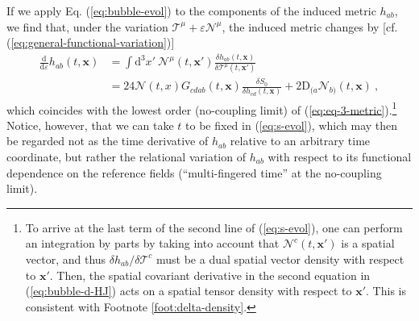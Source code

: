 \documentclass[12pt]{iopart}
\def\eq#1{\begin{equation}\begin{aligned}#1\end{aligned}\end{equation}}
\def\eref#1{(\ref{eq:#1})}
\def\D{\mathrm{d}}
\def\Del#1#2{\frac{\D#1}{\D#2}}
\def\N{\mathcal{N}}
\def\x{\mathbf{x}}
\def\T{\mathcal{T}}
\begin{document}
If we apply Eq. \eref{bubble-evol} to the components of the induced metric $h_{ab}$, we find that, under the variation $\T^{\mu}+\varepsilon\mathcal{N}^{\mu}$, the induced metric changes by [cf. \eref{general-functional-variation}]
\eq{\label{eq:s-evol}
\Del{}{\varepsilon}h_{ab}(t,\x) &= \int\D^3x'\ \N^{\mu}(t,\x')\frac{\delta h_{ab}(t,\x)}{\delta\T^{\mu}(t,\x')}\\
&=24\N(t,x)G_{cdab}(t,\x)\frac{\delta S_0}{\delta h_{cd}(t,\x)} +2\mathrm{D}_{(a}\N_{b)}(t,\x) \ ,
}
which coincides with the lowest order (no-coupling limit) of \eref{eq-3-metric}.\footnote{To arrive at the last term of the second line of \eref{s-evol}, one can perform an integration by parts by taking into account that $\mathcal{N}^c(t,\x')$ is a spatial vector, and thus $\delta h_{ab}/\delta\mathcal{T}^{c}$ must be a dual spatial vector density with respect to $\x'$. Then, the spatial covariant derivative in the second equation in \eref{bubble-d-HJ} acts on a spatial tensor density with respect to $\x'$. This is consistent with Footnote \ref{foot:delta-density}.} Notice, however, that we can take $t$ to be fixed in \eref{s-evol}, which may then be regarded not as the time derivative of $h_{ab}$ relative to an arbitrary time coordinate, but rather the relational variation of $h_{ab}$ with respect to its functional dependence on the reference fields (``multi-fingered time'' at the no-coupling limit).
\end{document}
